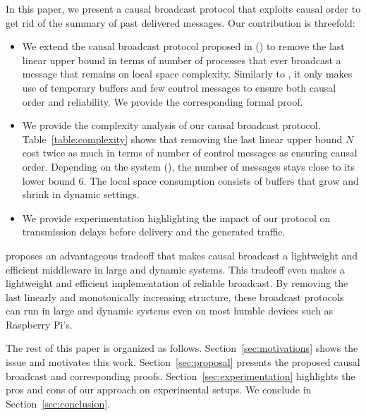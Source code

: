 In this paper, we present a causal broadcast protocol that exploits causal order
to get rid of the summary of past delivered messages. 
Our contribution is threefold:
\begin{itemize}
\item We extend the causal broadcast protocol proposed in (\REF) to remove the
  last linear upper bound in terms of number of processes that ever broadcast a
  message that remains on local space complexity. Similarly to \REF, it only
  makes use of temporary buffers and few control messages to ensure both causal
  order and reliability. We provide the corresponding formal proof.
\item We provide the complexity analysis of our causal broadcast
  protocol. Table~\ref{table:complexity} shows that removing the last linear
  upper bound $N$ cost twice as much in terms of number of control messages as
  ensuring causal order. Depending on the system (\REF), the number of messages
  stays close to its lower bound $6$. The local space consumption consists of
  buffers that grow and shrink in dynamic settings.
\item We provide experimentation highlighting the impact of our protocol on
  transmission delays before delivery and the generated traffic. 
\end{itemize}
\RPCBROADCAST proposes an advantageous tradeoff that makes causal broadcast a
lightweight and efficient middleware in large and dynamic systems. This tradeoff
even makes \RPCBROADCAST a lightweight and efficient implementation of reliable
broadcast. By removing the last linearly and monotonically increasing structure,
these broadcast protocols can run in large and dynamic systems even on most
humble devices such as Raspberry Pi's. 

The rest of this paper is organized as follows. Section~\ref{sec:motivations}
shows the issue and motivates this work. Section~\ref{sec:proposal} presents the
proposed causal broadcast and corresponding
proofs. Section~\ref{sec:experimentation} highlights the pros and cons of our
approach on experimental setups. We conclude in Section~\ref{sec:conclusion}.


